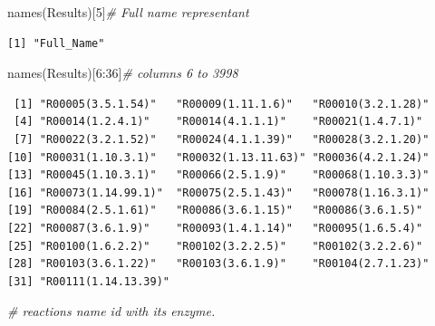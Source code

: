 \documentclass[
  letterpaper,
  DIV=11,
  numbers=noendperiod]{scrreprt}
\newenvironment{Shaded}{}{}
\newcommand{\AttributeTok}[1]{\textcolor[rgb]{0.78,0.47,0.87}{#1}}
\newcommand{\CommentTok}[1]{\textcolor[rgb]{0.36,0.39,0.44}{\textit{#1}}}
\newcommand{\DecValTok}[1]{\textcolor[rgb]{0.82,0.60,0.40}{#1}}
\newcommand{\FunctionTok}[1]{\textcolor[rgb]{0.38,0.69,0.94}{#1}}
\newcommand{\NormalTok}[1]{\textcolor[rgb]{0.67,0.70,0.75}{#1}}
\newcommand{\OtherTok}[1]{\textcolor[rgb]{0.15,0.68,0.38}{#1}}
\newcommand{\SpecialCharTok}[1]{\textcolor[rgb]{0.34,0.71,0.76}{#1}}
\newcommand{\StringTok}[1]{\textcolor[rgb]{0.60,0.76,0.47}{#1}}
\begin{document}
\begin{Shaded}
\begin{Highlighting}[]
\FunctionTok{names}\NormalTok{(Results)[}\DecValTok{5}\NormalTok{]}\CommentTok{\# Full name representant}
\end{Highlighting}
\end{Shaded}

\begin{verbatim}
[1] "Full_Name"
\end{verbatim}

\begin{Shaded}
\begin{Highlighting}[]
\FunctionTok{names}\NormalTok{(Results)[}\DecValTok{6}\SpecialCharTok{:}\DecValTok{36}\NormalTok{]}\CommentTok{\# columns 6 to 3998 }
\end{Highlighting}
\end{Shaded}

\begin{verbatim}
 [1] "R00005(3.5.1.54)"   "R00009(1.11.1.6)"   "R00010(3.2.1.28)"  
 [4] "R00014(1.2.4.1)"    "R00014(4.1.1.1)"    "R00021(1.4.7.1)"   
 [7] "R00022(3.2.1.52)"   "R00024(4.1.1.39)"   "R00028(3.2.1.20)"  
[10] "R00031(1.10.3.1)"   "R00032(1.13.11.63)" "R00036(4.2.1.24)"  
[13] "R00045(1.10.3.1)"   "R00066(2.5.1.9)"    "R00068(1.10.3.3)"  
[16] "R00073(1.14.99.1)"  "R00075(2.5.1.43)"   "R00078(1.16.3.1)"  
[19] "R00084(2.5.1.61)"   "R00086(3.6.1.15)"   "R00086(3.6.1.5)"   
[22] "R00087(3.6.1.9)"    "R00093(1.4.1.14)"   "R00095(1.6.5.4)"   
[25] "R00100(1.6.2.2)"    "R00102(3.2.2.5)"    "R00102(3.2.2.6)"   
[28] "R00103(3.6.1.22)"   "R00103(3.6.1.9)"    "R00104(2.7.1.23)"  
[31] "R00111(1.14.13.39)"
\end{verbatim}

\begin{Shaded}
\begin{Highlighting}[]
\CommentTok{\# reactions name id with its enzyme.}
\end{Highlighting}
\end{Shaded}

\begin{Shaded}
\end{Shaded}
\end{document}
